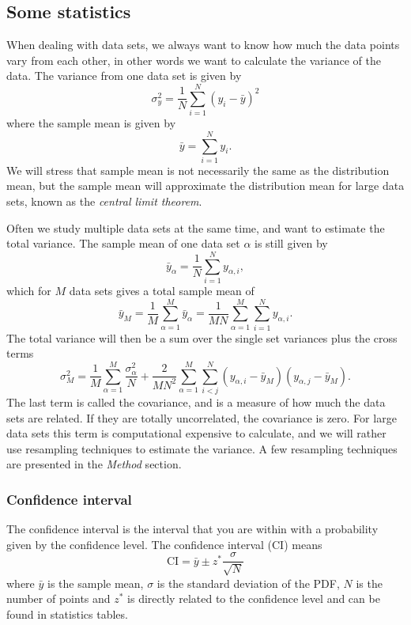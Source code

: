 \subsection{Some statistics} \label{sec:statistics}
When dealing with data sets, we always want to know how much the data points vary from each other, in other words we want to calculate the variance of the data. The variance from one data set is given by 
\begin{equation}
\sigma_y^2=\frac{1}{N}\sum_{i=1}^N(y_i-\bar{y})^2
\end{equation}
where the sample mean is given by
\begin{equation}
\bar{y}=\sum_{i=1}^Ny_i.
\end{equation}
We will stress that sample mean is not necessarily the same as the distribution mean, but the sample mean will approximate the distribution mean for large data sets, known as the \textit{central limit theorem}. \cite{StatMek}

Often we study multiple data sets at the same time, and want to estimate the total variance. The sample mean of one data set $\alpha$ is still given by
\begin{equation}
\bar{y}_{\alpha}=\frac{1}{N}\sum_{i=1}^Ny_{\alpha,i},
\end{equation}
which for $M$ data sets gives a total sample mean of
\begin{equation}
\bar{y}_M=\frac{1}{M}\sum_{\alpha=1}^M\bar{y}_{\alpha}=\frac{1}{MN}\sum_{\alpha=1}^M\sum_{i=1}^Ny_{\alpha,i}.
\end{equation}
The total variance will then be a sum over the single set variances plus the cross terms
\begin{equation}
\sigma_M^2=\frac{1}{M}\sum_{\alpha=1}^M\frac{\sigma_{\alpha}^2}{N}+\frac{2}{MN^2}\sum_{\alpha=1}^M\sum_{i<j}^N(y_{\alpha,i}-\bar{y}_M)(y_{\alpha,j}-\bar{y}_M).
\end{equation}
The last term is called the covariance, and is a measure of how much the data sets are related. If they are totally uncorrelated, the covariance is zero. For large data sets this term is computational expensive to calculate, and we will rather use resampling techniques to estimate the variance. A few resampling techniques are presented in the \textit{Method} section.

\subsubsection{Confidence interval} \label{sec:confidence}
The confidence interval is the interval that you are within with a probability given by the confidence level. The confidence interval (CI) means
\begin{equation}
\text{CI}=\bar{y}\pm z^*\frac{\sigma}{\sqrt{N}}
\end{equation}
where $\bar{y}$ is the sample mean, $\sigma$ is the standard deviation of the PDF, $N$ is the number of points and $z^*$ is directly related to the confidence level and can be found in statistics tables. 


